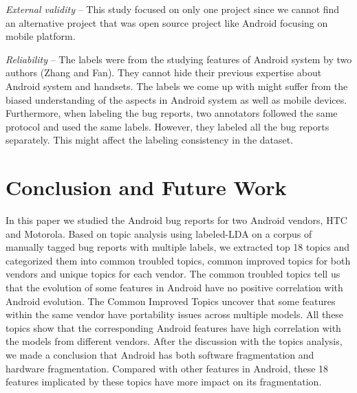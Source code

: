 \documentclass[10pt, conference, compsocconf]{IEEEtran}
\begin{document}
\textit{External validity} – This study focused on only one project since we cannot find an alternative project that was open source project like Android focusing on mobile platform.

\textit{Reliability} – The labels were from the studying features of Android system by two authors (Zhang and Fan). They cannot hide their previous expertise about Android system and handsets. The labels we come up with might suffer from the biased understanding of the aspects in Android system as well as mobile devices. Furthermore, when labeling the bug reports, two annotators followed the same protocol and used the same labels. However, they labeled all the bug reports separately. This might affect the labeling consistency in the dataset. 


\section{Conclusion and Future Work}

 In this paper we studied the Android bug reports for two Android vendors, HTC and Motorola. Based on topic analysis using labeled-LDA on a corpus of manually tagged bug reports with multiple labels, we extracted top 18 topics and categorized them into common troubled topics, common improved topics for both vendors and unique topics for each vendor. The common troubled topics tell us that the evolution of some features in Android have no positive correlation with Android evolution. The Common Improved Topics uncover that some features within the same vendor have portability issues across multiple models. All these topics show that the corresponding Android features have high correlation with the models from different vendors. After the discussion with the topics analysis, we made a conclusion that Android has both software fragmentation and hardware fragmentation. Compared with other features in Android, these 18 features implicated by these topics have more impact on its fragmentation.


\end{document}
